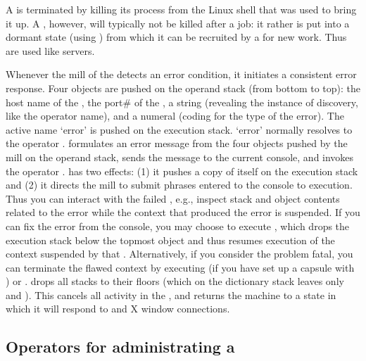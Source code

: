 A  is terminated by killing its process from the Linux
shell that was used to bring it up. A , however, will
typically not be killed after a job: it rather is put into a dormant
state (using ) from which it can be recruited by a
 for new work. Thus  are used like
servers.

Whenever the mill of the  detects an error condition, it
initiates a consistent error response. Four objects are pushed on the
operand stack (from bottom to top): the host name of the
, the port\# of the , a string (revealing
the instance of discovery, like the operator name), and a numeral
(coding for the type of the error). The active name `error' is pushed
on the execution stack. `error' normally resolves to the operator
.  formulates an error message from the four
objects pushed by the mill on the operand stack, sends the message to
the current console, and invokes the operator .  has
two effects: (1) it pushes a copy of itself on the execution stack and
(2) it directs the mill to submit phrases entered to the console to
execution. Thus you can interact with the failed , e.g.,
inspect stack and object contents related to the error while the
context that produced the error is suspended. If you can fix the error
from the console, you may choose to execute , which drops
the execution stack below the topmost  object and thus
resumes execution of the context suspended by that
. Alternatively, if you consider the problem fatal, you can
terminate the flawed context by executing  (if you have set
up a capsule with ) or .  drops all
stacks to their floors (which on the dictionary stack leaves only
 and ). This cancels all activity in the
, and returns the machine to a state in which it will
respond to  and X window connections.


\subsection{Operators for administrating  a }\label{ssec:opsdnode} 

